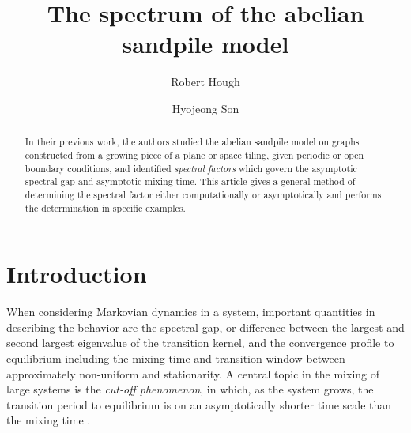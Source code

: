 \documentclass[a4paper, 12pt, notitlepage]{amsart}
\title[Sandpiles]{The spectrum of the abelian sandpile model}
\author{Robert Hough}
\author{Hyojeong Son}
\theoremstyle{remark}
\begin{document}
\begin{abstract}
In their previous work, the authors studied the abelian sandpile model on graphs constructed from a growing piece of a plane or space tiling, given periodic or open boundary conditions, and identified \emph{spectral factors} which govern the asymptotic spectral gap and asymptotic mixing time.  This article gives a general method of determining the spectral factor either computationally or asymptotically and performs the determination in specific examples.  
\end{abstract}

\maketitle

\section{Introduction} When considering Markovian dynamics in a  system, important quantities in describing the behavior are the spectral gap, or difference between the largest and second largest eigenvalue of the transition kernel, and the convergence profile to equilibrium including the mixing time and transition window between approximately non-uniform and stationarity.  A central topic in the mixing of large systems is the \emph{cut-off phenomenon}, in which, as the system grows, the transition period to equilibrium is on an asymptotically shorter time scale than the mixing time \cite{D96}.
\end{document}
